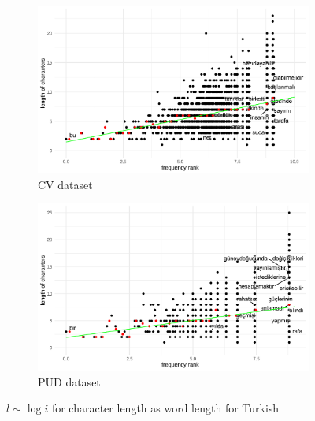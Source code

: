 \begin{figure}[H]
  \centering
  \begin{subfigure}[b]{0.48\textwidth}
    \centering
    \includegraphics[width=\textwidth]{plots/Turkish_logi_cl_CV.pdf}
    \caption{CV dataset}
  \end{subfigure}
  \hfill
  \begin{subfigure}[b]{0.48\textwidth}
    \centering
    \includegraphics[width=\textwidth]{plots/Turkish_logi_cl_PUD.pdf}
    \caption{PUD dataset}
  \end{subfigure}
  \caption{$l \sim \log i$ for character length as word length for Turkish}
\end{figure}
